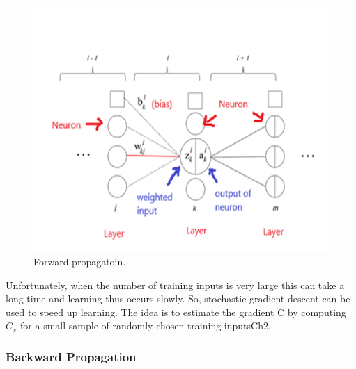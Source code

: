 \documentclass{article}
\begin{document}
\begin{figure}[H]
\centering
\includegraphics[scale=0.75]{img/forward.png}
\caption{Forward propagatoin.}
\label{forward}
\end{figure} 
Unfortunately, when the number of training inputs is very large this can take a long time and learning thus occurs slowly. So, stochastic gradient descent can be used to speed up learning. The idea is to estimate the gradient C by computing $C_x$ for a small sample of randomly chosen training inputs\protect\cite{NN}Ch2.

\subsubsection{Backward Propagation}
\end{document}
